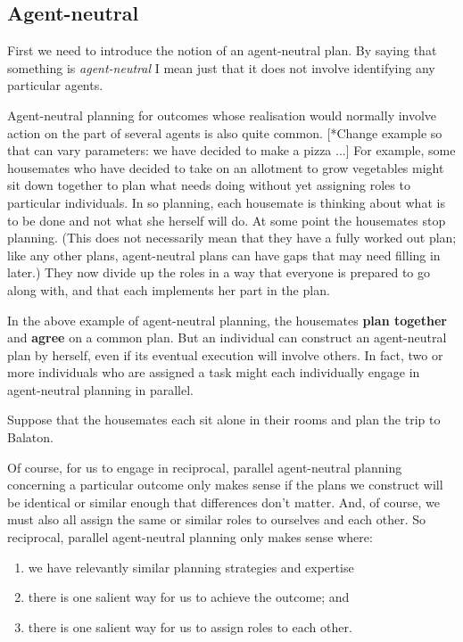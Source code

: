 \documentclass[12pt,\papersize]{extarticle}
\begin{document}
\subsection{Agent-neutral}

First we need to introduce the notion of an agent-neutral plan.
By saying that something is \emph{agent-neutral} I mean just that it does not involve identifying any particular agents.  


Agent-neutral planning for outcomes whose realisation would normally involve action on the part of several agents is also quite common.
[*Change example so that can vary parameters: we have decided to make a pizza ...]
For example, some housemates who have decided to take on an allotment to grow vegetables might sit down together to plan what needs doing without yet assigning roles to particular individuals. 
In so planning, each housemate is thinking about what is to be done and not what she herself will do.  
At some point the housemates stop planning.
(This does not necessarily mean that they have a fully worked out plan; like any other plans, agent-neutral plans can have gaps that may need filling in later.)
They now divide up the roles in a way that everyone is prepared to go along with,
	and that each implements her part in the plan.



In the above example of agent-neutral planning,
	the housemates \textbf{plan together} and \textbf{agree} on a common plan.
But an individual can construct an agent-neutral plan by herself, even if its eventual execution will involve others.
	In fact, two or more individuals who are assigned a task might each individually engage in agent-neutral planning in parallel.
	
Suppose that the housemates each sit alone in their rooms and plan the trip to Balaton.

	
Of course, for us to engage in reciprocal, parallel agent-neutral planning concerning a particular outcome only makes sense if the  plans we construct will be identical or similar enough that differences don't matter.
And, of course, we must also all assign the same or similar roles to ourselves and each other.
So reciprocal, parallel agent-neutral planning only makes sense where: 
\begin{enumerate}
\item 	we have relevantly similar planning strategies and expertise
\item there is one salient way for us to achieve the outcome; and
\item there is one salient way for us to assign roles to each other.
\end{enumerate}
\end{document}
